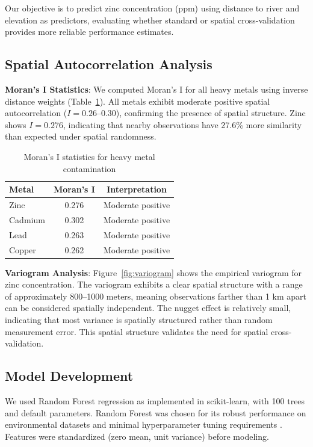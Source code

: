 \documentclass[review,12pt]{elsarticle}
\begin{document}
Our objective is to predict zinc concentration (ppm) using distance to river and elevation as predictors, evaluating whether standard or spatial cross-validation provides more reliable performance estimates.

\subsection{Spatial Autocorrelation Analysis}

\textbf{Moran's I Statistics}: We computed Moran's I for all heavy metals using inverse distance weights (Table~\ref{tab:morans}). All metals exhibit moderate positive spatial autocorrelation ($I = 0.26$--$0.30$), confirming the presence of spatial structure. Zinc shows $I = 0.276$, indicating that nearby observations have 27.6\% more similarity than expected under spatial randomness.

\begin{table}[ht]
\centering
\caption{Moran's I statistics for heavy metal contamination}
\label{tab:morans}
\begin{tabular}{lcc}
\toprule
Metal & Moran's I & Interpretation \\
\midrule
Zinc & 0.276 & Moderate positive \\
Cadmium & 0.302 & Moderate positive \\
Lead & 0.263 & Moderate positive \\
Copper & 0.262 & Moderate positive \\
\bottomrule
\end{tabular}
\end{table}

\textbf{Variogram Analysis}: Figure~\ref{fig:variogram} shows the empirical variogram for zinc concentration. The variogram exhibits a clear spatial structure with a range of approximately 800--1000 meters, meaning observations farther than 1 km apart can be considered spatially independent. The nugget effect is relatively small, indicating that most variance is spatially structured rather than random measurement error. This spatial structure validates the need for spatial cross-validation.

\subsection{Model Development}

We used Random Forest regression \citep{breiman2001random} as implemented in scikit-learn, with 100 trees and default parameters. Random Forest was chosen for its robust performance on environmental datasets and minimal hyperparameter tuning requirements \citep{hengl2018random}. Features were standardized (zero mean, unit variance) before modeling.
\end{document}
